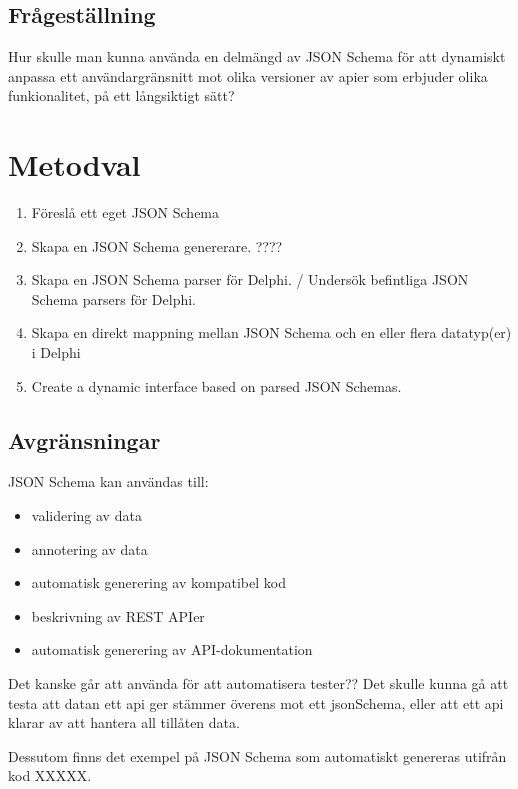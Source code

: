 \documentclass[swedish]{kththesis}
\begin{document}


\section{Frågeställning}

Hur skulle man kunna använda en delmängd av JSON Schema för att dynamiskt anpassa ett användargränsnitt mot olika versioner av apier som erbjuder olika funkionalitet, på ett långsiktigt sätt?


\chapter{Metodval}

\begin{enumerate}
	\item Föreslå ett eget JSON Schema
	\item Skapa en JSON Schema genererare. ????
	\item Skapa en JSON Schema parser för Delphi. / Undersök befintliga JSON Schema parsers för Delphi.
	\item Skapa en direkt mappning mellan JSON Schema och en eller flera datatyp(er) i Delphi
	\item Create a dynamic interface based on parsed JSON Schemas.
\end{enumerate}

\section{Avgränsningar}

JSON Schema kan användas till:
\begin{itemize}
	\item validering av data
	\item annotering av data
	\item automatisk generering av kompatibel kod
	\item beskrivning av REST APIer
	\item automatisk generering av API-dokumentation
\end{itemize}

Det kanske går att använda för att automatisera tester?? Det skulle kunna gå att testa att datan ett api ger stämmer överens mot ett jsonSchema, eller att ett api klarar av att hantera all tillåten data.

Dessutom finns det exempel på JSON Schema som automatiskt genereras utifrån kod XXXXX.
\end{document}
